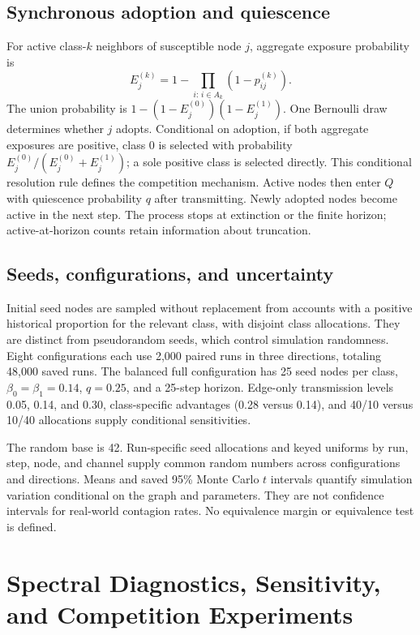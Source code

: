 \documentclass[11pt,a4paper]{article}
\begin{document}
\subsection{Synchronous adoption and quiescence}
For active class-$k$ neighbors of susceptible node $j$, aggregate exposure probability is
\begin{equation}
E_j^{(k)}=1-\prod_{i:\,i\in A_k}(1-p_{ij}^{(k)}).
\end{equation}
The union probability is $1-(1-E_j^{(0)})(1-E_j^{(1)})$. One Bernoulli draw determines whether $j$ adopts. Conditional on adoption, if both aggregate exposures are positive, class 0 is selected with probability $E_j^{(0)}/(E_j^{(0)}+E_j^{(1)})$; a sole positive class is selected directly. This conditional resolution rule defines the competition mechanism. Active nodes then enter $Q$ with quiescence probability $q$ after transmitting. Newly adopted nodes become active in the next step. The process stops at extinction or the finite horizon; active-at-horizon counts retain information about truncation.

\subsection{Seeds, configurations, and uncertainty}
Initial seed nodes are sampled without replacement from accounts with a positive historical proportion for the relevant class, with disjoint class allocations. They are distinct from pseudorandom seeds, which control simulation randomness. Eight configurations each use 2,000 paired runs in three directions, totaling 48,000 saved runs. The balanced full configuration has 25 seed nodes per class, $\beta_0=\beta_1=0.14$, $q=0.25$, and a 25-step horizon. Edge-only transmission levels 0.05, 0.14, and 0.30, class-specific advantages (0.28 versus 0.14), and 40/10 versus 10/40 allocations supply conditional sensitivities.

The random base is 42. Run-specific seed allocations and keyed uniforms by run, step, node, and channel supply common random numbers across configurations and directions. Means and saved 95\% Monte Carlo $t$ intervals quantify simulation variation conditional on the graph and parameters. They are not confidence intervals for real-world contagion rates. No equivalence margin or equivalence test is defined.
\FloatBarrier

\section{Spectral Diagnostics, Sensitivity, and Competition Experiments}
\end{document}
